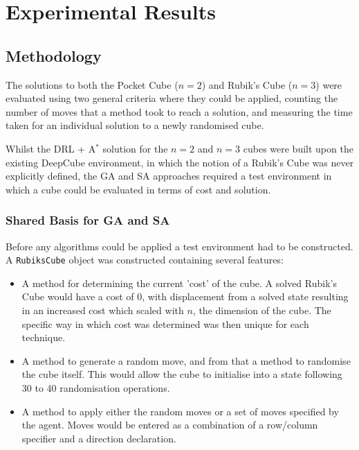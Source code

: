 \documentclass[UKenglish]{svproc}
\begin{document}

\section{Experimental Results}

\subsection{Methodology}
The solutions to both the Pocket Cube ($n=2$) and Rubik's Cube ($n=3$) were evaluated using two general criteria where they could be applied, counting the number of moves that a method took to reach a solution, and measuring the time taken for an individual solution to a newly randomised cube.

Whilst the DRL + A$^{\ast}$ solution for the $n=2$ and $n=3$ cubes were built upon the existing DeepCube environment, in which the notion of a Rubik's Cube was never explicitly defined, the GA and SA approaches required a test environment in which a cube could be evaluated in terms of cost and solution.

\subsubsection{Shared Basis for GA and SA}
Before any algorithms could be applied a test environment had to be constructed. A \verb|RubiksCube| object was constructed containing several features:
\begin{itemize}
    \item A method for determining the current 'cost' of the cube. A solved Rubik's Cube would have a cost of 0, with displacement from a solved state resulting in an increased cost which scaled with $n$, the dimension of the cube. The specific way in which cost was determined was then unique for each technique.
    \item A method to generate a random move, and from that a method to randomise the cube itself. This would allow the cube to initialise into a state following 30 to 40 randomisation operations.
    \item A method to apply either the random moves or a set of moves specified by the agent. Moves would be entered as a combination of a row/column specifier and a direction declaration.
\end{itemize}
\end{document}
